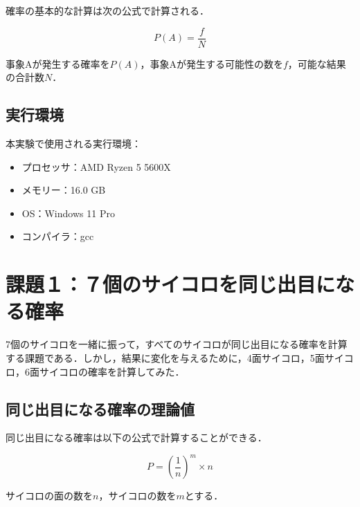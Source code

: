 \documentclass[a4j, titlepage]{jarticle}
\begin{document}
    確率の基本的な計算は次の公式で計算される．
    \begin{screen}
      \begin{equation}
        P(A) = \frac{f}{N}
      \end{equation}
    \end{screen}
    事象Aが発生する確率を$P(A)$，事象Aが発生する可能性の数を$f$，可能な結果の合計数$N$．

  \subsection{実行環境}
    本実験で使用される実行環境：
    \begin{screen}
        \begin{itemize}
            \item プロセッサ：AMD Ryzen 5 5600X
            \item メモリー：16.0 GB
            \item OS：Windows 11 Pro
            \item コンパイラ：gcc
        \end{itemize}    
    \end{screen}

  \section{課題１：７個のサイコロを同じ出目になる確率}
  7個のサイコロを一緒に振って，すべてのサイコロが同じ出目になる確率を計算する課題である．しかし，結果に変化を与えるために，4面サイコロ，5面サイコロ，6面サイコロの確率を計算してみた．

  \subsection{同じ出目になる確率の理論値}
    同じ出目になる確率は以下の公式で計算することができる．
    \begin{screen}
      \begin{equation}
        P =  \left(\frac{1}{n}\right)^m \times n
      \end{equation}
    \end{screen}
    サイコロの面の数を$n$，サイコロの数を$m$とする．
\end{document}
